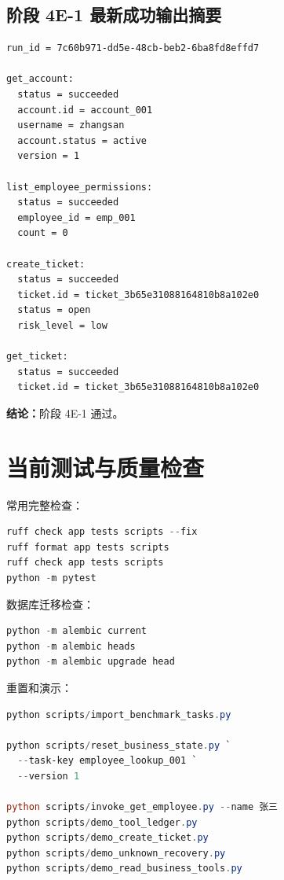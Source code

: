 \documentclass[11pt,a4paper]{ctexart}
\begin{document}
\subsection{阶段 4E-1 最新成功输出摘要}

\begin{lstlisting}
run_id = 7c60b971-dd5e-48cb-beb2-6ba8fd8effd7

get_account:
  status = succeeded
  account.id = account_001
  username = zhangsan
  account.status = active
  version = 1

list_employee_permissions:
  status = succeeded
  employee_id = emp_001
  count = 0

create_ticket:
  status = succeeded
  ticket.id = ticket_3b65e31088164810b8a102e0
  status = open
  risk_level = low

get_ticket:
  status = succeeded
  ticket.id = ticket_3b65e31088164810b8a102e0
\end{lstlisting}

\textbf{结论：}阶段 4E-1 通过。

\section{当前测试与质量检查}

常用完整检查：

\begin{lstlisting}[language=PowerShell]
ruff check app tests scripts --fix
ruff format app tests scripts
ruff check app tests scripts
python -m pytest
\end{lstlisting}

数据库迁移检查：

\begin{lstlisting}[language=PowerShell]
python -m alembic current
python -m alembic heads
python -m alembic upgrade head
\end{lstlisting}

重置和演示：

\begin{lstlisting}[language=PowerShell]
python scripts/import_benchmark_tasks.py

python scripts/reset_business_state.py `
  --task-key employee_lookup_001 `
  --version 1

python scripts/invoke_get_employee.py --name 张三
python scripts/demo_tool_ledger.py
python scripts/demo_create_ticket.py
python scripts/demo_unknown_recovery.py
python scripts/demo_read_business_tools.py
\end{lstlisting}
\end{document}
